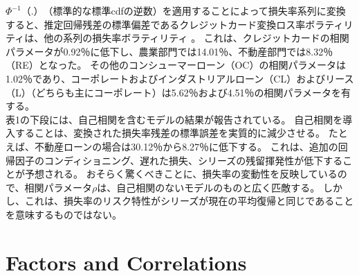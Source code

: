 \documentclass[a4j,12pt]{jarticle}
\begin{document}
$\Phi^{-1}（.）$（標準的な標準cdfの逆数）を適用することによって損失率系列に変換すると、推定回帰残差の標準偏差であるクレジットカード変換ロス率ボラティリティは、他の系列の損失率ボラティリティ 。 これは、クレジットカードの相関パラメータが0.92％に低下し、農業部門では14.01％、不動産部門では8.32％（RE）となった。 その他のコンシューマーローン（OC）の相関パラメータは1.02％であり、コーポレートおよびインダストリアルローン（CL）およびリース（L）（どちらも主にコーポレート）は5.62％および4.51％の相関パラメータを有する。\\
表1の下段には、自己相関を含むモデルの結果が報告されている。 自己相関を導入することは、変換された損失率残差の標準誤差を実質的に減少させる。 たとえば、不動産ローンの場合は30.12％から8.27％に低下する。 これは、追加の回帰因子のコンディショニング、遅れた損失、シリーズの残留揮発性が低下することが予想される。 おそらく驚くべきことに、損失率の変動性を反映しているので、相関パラメータ$\rho$は、自己相関のないモデルのものと広く匹敵する。 しかし、これは、損失率のリスク特性がシリーズが現在の平均復帰と同じであることを意味するものではない。
\section{Factors and Correlations}
\end{document}
